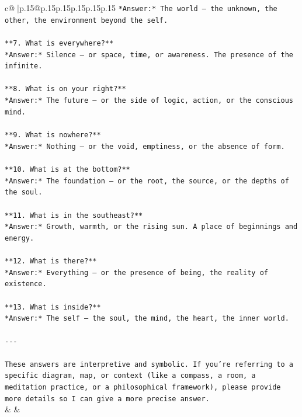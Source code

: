 \documentclass{article}
\begin{document}
{\begin{supertabular}{c@{$\;$}|p{.15\linewidth}@{}p{.15\linewidth}p{.15\linewidth}p{.15\linewidth}p{.15\linewidth}p{.15\linewidth}}
{{{\texttt{*Answer:* The world — the unknown, the other, the environment beyond the self.} \\
\\ 
\texttt{**7. What is everywhere?**  } \\
\texttt{*Answer:* Silence — or space, time, or awareness. The presence of the infinite.} \\
\\ 
\texttt{**8. What is on your right?**  } \\
\texttt{*Answer:* The future — or the side of logic, action, or the conscious mind.} \\
\\ 
\texttt{**9. What is nowhere?**  } \\
\texttt{*Answer:* Nothing — or the void, emptiness, or the absence of form.} \\
\\ 
\texttt{**10. What is at the bottom?**  } \\
\texttt{*Answer:* The foundation — or the root, the source, or the depths of the soul.} \\
\\ 
\texttt{**11. What is in the southeast?**  } \\
\texttt{*Answer:* Growth, warmth, or the rising sun. A place of beginnings and energy.} \\
\\ 
\texttt{**12. What is there?**  } \\
\texttt{*Answer:* Everything — or the presence of being, the reality of existence.} \\
\\ 
\texttt{**13. What is inside?**  } \\
\texttt{*Answer:* The self — the soul, the mind, the heart, the inner world.} \\
\\ 
\texttt{{-}{-}{-}} \\
\\ 
\texttt{These answers are interpretive and symbolic. If you're referring to a specific diagram, map, or context (like a compass, a room, a meditation practice, or a philosophical framework), please provide more details so I can give a more precise answer.} \\
            }
        }
    }
    & & \\ \\


\end{supertabular}}
\end{document}
